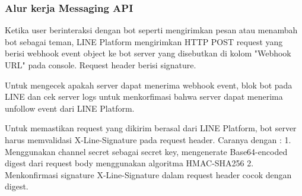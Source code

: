 \subsubsection{Alur kerja Messaging API}
Ketika user berinteraksi dengan bot seperti mengirimkan pesan atau menambah bot sebagai teman, LINE Platform mengirimkan HTTP POST request yang berisi webhook event object ke bot server yang disebutkan di kolom "Webhook URL" pada console. Request header berisi signature. 

Untuk mengecek apakah server dapat menerima webhook event, blok bot pada LINE dan cek server logs untuk menkorfimasi bahwa server dapat menerima unfollow event dari LINE Platform.

Untuk memastikan request yang dikirim berasal dari LINE Platform, bot server harus memvalidasi X-Line-Signature pada request header. Caranya dengan :
1. Menggunakan channel secret sebagai secret key, mengenerate Base64-encoded digest dari request body menggunakan algoritma HMAC-SHA256
2. Menkonfirmasi signature X-Line-Signature dalam request header cocok dengan digest.
 

